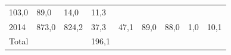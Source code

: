 \begin{longtable}[]{@{}lllllllll@{}}
\begin{minipage}[t]{0.07\columnwidth}
103,0\strut
\end{minipage} & \begin{minipage}[t]{0.07\columnwidth}\raggedright
89,0\strut
\end{minipage} & \begin{minipage}[t]{0.11\columnwidth}\raggedright
14,0\strut
\end{minipage} & \begin{minipage}[t]{0.14\columnwidth}\raggedright
11,3\strut
\end{minipage}\tabularnewline
\begin{minipage}[t]{0.05\columnwidth}\raggedright
2014\strut
\end{minipage} & \begin{minipage}[t]{0.08\columnwidth}\raggedright
873,0\strut
\end{minipage} & \begin{minipage}[t]{0.05\columnwidth}\raggedright
824,2\strut
\end{minipage} & \begin{minipage}[t]{0.10\columnwidth}\raggedright
37,3\strut
\end{minipage} & \begin{minipage}[t]{0.10\columnwidth}\raggedright
47,1\strut
\end{minipage} & \begin{minipage}[t]{0.07\columnwidth}\raggedright
89,0\strut
\end{minipage} & \begin{minipage}[t]{0.07\columnwidth}\raggedright
88,0\strut
\end{minipage} & \begin{minipage}[t]{0.11\columnwidth}\raggedright
1,0\strut
\end{minipage} & \begin{minipage}[t]{0.14\columnwidth}\raggedright
10,1\strut
\end{minipage}\tabularnewline
\begin{minipage}[t]{0.05\columnwidth}\raggedright
Total\strut
\end{minipage} & \begin{minipage}[t]{0.08\columnwidth}\raggedright
\strut
\end{minipage} & \begin{minipage}[t]{0.05\columnwidth}\raggedright
\strut
\end{minipage} & \begin{minipage}[t]{0.10\columnwidth}\raggedright
196,1\strut
\end{minipage} & \begin{minipage}[t]{0.10\columnwidth}\raggedright

\end{minipage}
\end{longtable}
